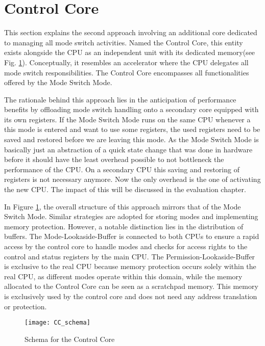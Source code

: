 \section{Control Core}
This section explains the second approach involving an additional core
dedicated to managing all mode switch activities. Named the Control Core, this
entity exists alongside the CPU as an independent unit with its dedicated
memory(see Fig. \ref{fig:cc_schema}). Conceptually, it resembles an accelerator
where the CPU delegates all mode switch responsibilities. The Control Core
encompasses all functionalities offered by the Mode Switch Mode.\par
The rationale behind this approach lies in the anticipation of performance
benefits by offloading mode switch handling onto a secondary core equipped with
its own registers. If the Mode Switch Mode runs on the same CPU whenever a this
mode is entered and want to use some registers, the used registers need to be
saved and restored before we are leaving this mode. As the Mode Switch Mode is
basically just an abstraction of a quick state change that was done in hardware
before it should have the least overhead possible to not bottleneck the
performance of the CPU. On a secondary CPU this saving and restoring of
registers is not necessary anymore. Now the only overhead is the one of
activating the new CPU. The impact of this will be discussed in the evaluation
chapter.\par 
In Figure \ref{fig:cc_schema}, the overall structure of this approach mirrors that
of the Mode Switch Mode. Similar strategies are adopted for storing modes and implementing
memory protection. However, a notable distinction lies in the distribution of
buffers. The Mode-Lookaside-Buffer is connected to both CPUs to ensure a rapid
access by the control core to handle modes and checks for access rights to the
control and status registers by the main CPU. The Permission-Lookaside-Buffer is
exclusive to the real CPU because memory protection occurs solely within the real CPU,
as different modes operate within this domain, while the memory allocated to the
Control Core can be seen as a scratchpad memory. This memory is exclusively used
by the control core and does not need any address translation or protection.\par

\begin{figure}[H]
    \centering
    \texttt{[image: CC\_schema]}
    \caption{Schema for the Control Core}
    \label{fig:cc_schema}
\end{figure}

